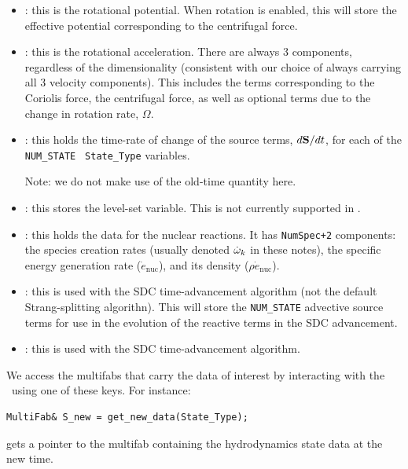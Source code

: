 \begin{itemize}
\item {} : this is the rotational potential.
  When rotation is enabled, this will store the effective potential
  corresponding to the centrifugal force. 

\item {} : this is the rotational acceleration.
  There are always 3 components, regardless of the dimensionality
  (consistent with our choice of always carrying all 3 velocity
  components).  This includes the terms corresponding to the Coriolis
  force, the centrifugal force, as well as optional terms due to the
  change in rotation rate, $\Omega$.

\item {} : this holds the time-rate of change of
  the source terms, $d{\bf S}/dt$, for each of the {\tt NUM\_STATE} {\tt
    State\_Type} variables.

  Note: we do not make use of the old-time quantity here. 

\item {} : this stores the level-set variable.
  This is not currently supported in \castro.

\item {} : this holds the data for the nuclear
  reactions.  It has {\tt NumSpec+2} components: the species
  creation rates (usually denoted $\dot\omega_k$ in these notes),
  the specific energy generation rate ($\dot{e}_\mathrm{nuc}$),
  and its density ($\rho \dot{e}_\mathrm{nuc}$).  

\item {} : this is used with the SDC
  time-advancement algorithm (not the default Strang-splitting
  algorithn).  This will store the {\tt NUM\_STATE} advective source
  terms for use in the evolution of the reactive terms in the SDC
  advancement.

\item {} : this is used with the SDC
  time-advancement algorithm.  

\end{itemize}

We access the multifabs that carry the data of interest by interacting
with the \statedata\ using one of these keys.  For instance:
\begin{lstlisting}
MultiFab& S_new = get_new_data(State_Type);
\end{lstlisting}
gets a pointer to the multifab containing the hydrodynamics state data
at the new time.



